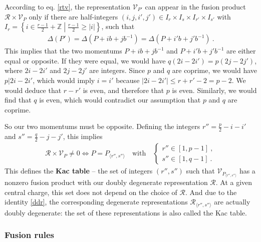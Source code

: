 \documentclass[12pt, a4paper, notitlepage, twoside]{report}
\numberwithin{equation}{section}
\theoremstyle{break}
\begin{document}
According to eq. \eqref{rtv}, the representation $\mathcal{V}_{P'} $ can appear in the fusion product $\mathcal{R}\times \mathcal{V}_P$ only if there are half-integers $(i,j,i',j')\in I_r\times I_s\times I_{r'}\times I_{s'}$ with $I_r=\left\{i\in \frac{r-1}{2}+\mathbb{Z}\middle| \frac{r-1}{2}\geq |i|\right\}$, such that  
\begin{align}
 \Delta(P') = \Delta\left(P+ ib+jb^{-1}\right) = \Delta\left(P+i'b+j'b^{-1}\right) \ .
 \label{dppdp}
\end{align}
This implies that the two momentums $P+ib+jb^{-1}$ and $ P+i'b+j'b^{-1}$ are either equal or opposite. If they were equal, we would have $q(2i-2i')=p(2j-2j')$, where $2i-2i'$ and $2j-2j'$ are integers. Since $p$ and $q$ are coprime, we would have $p|2i-2i'$, which would imply $i=i'$ because $|2i-2i'|\leq r+r'-2=p-2$. We would deduce that $r-r'$ is even, and therefore that $p$ is even. Similarly, we would find that $q$ is even, which would contradict our assumption that $p$ and $q$ are coprime.

So our two momentums must be opposite. Defining the integers $r'' = \frac{p}{2}-i-i'$ and $s''=\frac{q}{2}-j-j'$, this implies
\begin{align}
 \mathcal{R}\times \mathcal{V}_P \neq 0 \iff    P=P_{\langle r'',s'' \rangle}\quad \text{with}\quad  \left\{\begin{array}{l}  r'' \in [1,p-1]\ , \\ s'' \in [1,q-1]\ . \end{array}\right. 
\label{rpsq}
\end{align}
This defines the \textbf{\boldmath Kac table} -- the set of integers $(r'',s'')$ such that $\mathcal{V}_{P_{\langle r'',s''\rangle}}$ has a nonzero fusion product with our doubly degenerate representation $\mathcal{R}$.
At a given central charge, this set does not depend on the choice of $\mathcal{R}$. 
And due to the identity \eqref{ddr},
the corresponding degenerate representations $\mathcal{R}_{\langle r'', s'' \rangle}$ are actually doubly degenerate: the set of these representations is also called the Kac table.

\subsubsection{Fusion rules}
\end{document}
